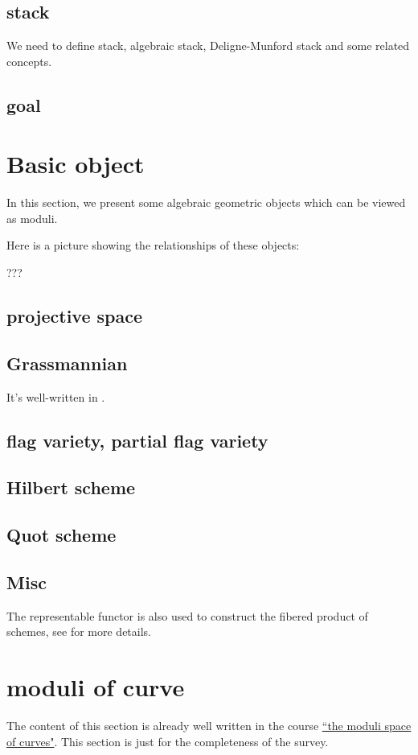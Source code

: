 \documentclass[reqno,11pt]{amsart}
\numberwithin{equation}{section}
\theoremstyle{plain}
\theoremstyle{plain}
\numberwithin{equation}{section}
\theoremstyle{remark}
\begin{document}
\subsection{stack}
We need to define stack, algebraic stack, Deligne-Munford stack and some related concepts.
\subsection{goal}
\section{Basic object}
In this section, we present some algebraic geometric objects which can be viewed as moduli.

Here is a picture showing the relationships of these objects:

???
\subsection{projective space}
\subsection{Grassmannian}
It's well-written in \cite[16.7]{FOAG}.
\subsection{flag variety, partial flag variety}
\subsection{Hilbert scheme}
\subsection{Quot scheme}
\subsection{Misc}The representable functor is also used to construct the fibered product of schemes, see \cite[9.1.6-7]{FOAG} for more details.
\section{moduli of curve}
The content of this section is already well written in the course \href{https://johannesschmitt.gitlab.io/moduli_of_curves}{``the moduli space of curves"}. This section is just for the completeness of the survey.
\end{document}
